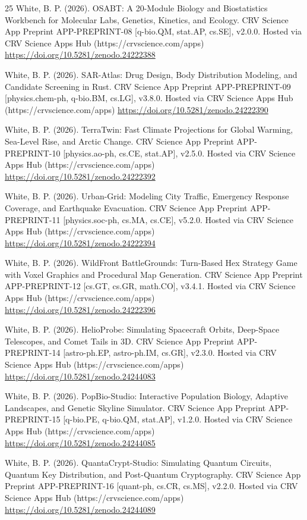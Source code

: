 \documentclass[10pt,letterpaper]{article}
\begin{document}
\begin{thebibliography}{25}
 White, B. P. (2026). OSABT: A 20-Module Biology and Biostatistics Workbench for Molecular Labs, Genetics, Kinetics, and Ecology. CRV Science App Preprint APP-PREPRINT-08 [q-bio.QM, stat.AP, cs.SE], v2.0.0. Hosted via CRV Science Apps Hub (https://crvscience.com/apps) \url{https://doi.org/10.5281/zenodo.24222388}

 White, B. P. (2026). SAR-Atlas: Drug Design, Body Distribution Modeling, and Candidate Screening in Rust. CRV Science App Preprint APP-PREPRINT-09 [physics.chem-ph, q-bio.BM, cs.LG], v3.8.0. Hosted via CRV Science Apps Hub (https://crvscience.com/apps) \url{https://doi.org/10.5281/zenodo.24222390}

 White, B. P. (2026). TerraTwin: Fast Climate Projections for Global Warming, Sea-Level Rise, and Arctic Change. CRV Science App Preprint APP-PREPRINT-10 [physics.ao-ph, cs.CE, stat.AP], v2.5.0. Hosted via CRV Science Apps Hub (https://crvscience.com/apps) \url{https://doi.org/10.5281/zenodo.24222392}

 White, B. P. (2026). Urban-Grid: Modeling City Traffic, Emergency Response Coverage, and Earthquake Evacuation. CRV Science App Preprint APP-PREPRINT-11 [physics.soc-ph, cs.MA, cs.CE], v5.2.0. Hosted via CRV Science Apps Hub (https://crvscience.com/apps) \url{https://doi.org/10.5281/zenodo.24222394}

 White, B. P. (2026). WildFront BattleGrounds: Turn-Based Hex Strategy Game with Voxel Graphics and Procedural Map Generation. CRV Science App Preprint APP-PREPRINT-12 [cs.GT, cs.GR, math.CO], v3.4.1. Hosted via CRV Science Apps Hub (https://crvscience.com/apps) \url{https://doi.org/10.5281/zenodo.24222396}

 White, B. P. (2026). HelioProbe: Simulating Spacecraft Orbits, Deep-Space Telescopes, and Comet Tails in 3D. CRV Science App Preprint APP-PREPRINT-14 [astro-ph.EP, astro-ph.IM, cs.GR], v2.3.0. Hosted via CRV Science Apps Hub (https://crvscience.com/apps) \url{https://doi.org/10.5281/zenodo.24244083}

 White, B. P. (2026). PopBio-Studio: Interactive Population Biology, Adaptive Landscapes, and Genetic Skyline Simulator. CRV Science App Preprint APP-PREPRINT-15 [q-bio.PE, q-bio.QM, stat.AP], v1.2.0. Hosted via CRV Science Apps Hub (https://crvscience.com/apps) \url{https://doi.org/10.5281/zenodo.24244085}

 White, B. P. (2026). QuantaCrypt-Studio: Simulating Quantum Circuits, Quantum Key Distribution, and Post-Quantum Cryptography. CRV Science App Preprint APP-PREPRINT-16 [quant-ph, cs.CR, cs.MS], v2.2.0. Hosted via CRV Science Apps Hub (https://crvscience.com/apps) \url{https://doi.org/10.5281/zenodo.24244089}


\end{thebibliography}
\end{document}
